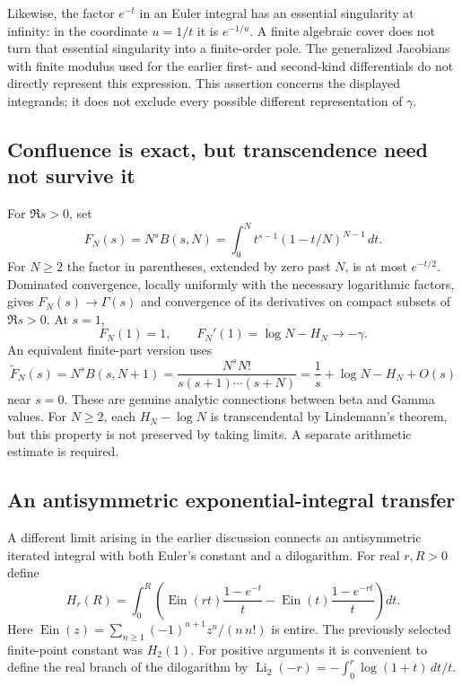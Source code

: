 \documentclass[11pt,a4paper]{article}
\theoremstyle{definition}
\theoremstyle{remark}
\numberwithin{equation}{section}
\begin{document}
Likewise, the factor $e^{-t}$ in an Euler integral has an essential
singularity at infinity: in the coordinate $u=1/t$ it is $e^{-1/u}$.
A finite algebraic cover does not turn that essential singularity into
a finite-order pole. The generalized Jacobians with finite modulus used
for the earlier first- and second-kind differentials do not directly
represent this expression. This assertion concerns the displayed
integrands; it does not exclude every possible different representation
of $\gamma$.

\subsection{Confluence is exact, but transcendence need not survive it}
\label{gamma-confluence}

For $\Re s>0$, set
\[
 F_N(s)=N^sB(s,N)
 =\int_0^N t^{s-1}(1-t/N)^{N-1}\,dt.
\]
For $N\ge2$ the factor in parentheses, extended by zero past $N$, is
at most $e^{-t/2}$. Dominated convergence, locally uniformly with the
necessary logarithmic factors, gives
$F_N(s)\to\Gamma(s)$ and convergence of its derivatives on compact
subsets of $\Re s>0$. At $s=1$,
\begin{equation} F_N(1)=1,\qquad F_N'(1)=\log N-H_N\longrightarrow-\gamma.
 \label{gamma-confluence-derivative}
\end{equation}
An equivalent finite-part version uses
\[
 \widetilde F_N(s)=N^sB(s,N+1)
 =\frac{N^sN!}{s(s+1)\cdots(s+N)}
 =\frac1s+\log N-H_N+O(s)
\]
near $s=0$. These are genuine analytic connections between beta and
Gamma values. For $N\ge2$, each $H_N-\log N$ is transcendental by
Lindemann's theorem, but this property is not preserved by taking
limits. A separate arithmetic estimate is required.

\subsection{An antisymmetric exponential-integral transfer}
\label{gamma-antisymmetric}

A different limit arising in the earlier discussion connects an
antisymmetric iterated integral with both Euler's constant and a
dilogarithm. For real $r,R>0$ define
\[
 H_r(R)=\int_0^R\left(
 \operatorname{Ein}(rt)\frac{1-e^{-t}}t
 -\operatorname{Ein}(t)\frac{1-e^{-rt}}t\right)dt.
\]
Here $\operatorname{Ein}(z)=\sum_{n\ge1}(-1)^{n+1}z^n/(n\,n!)$
is entire.
The previously selected finite-point constant was $H_2(1)$.
For positive arguments it is convenient to define the real branch
of the dilogarithm by
$\operatorname{Li}_2(-r)=-\int_0^r\log(1+t)\,dt/t$.
\end{document}

